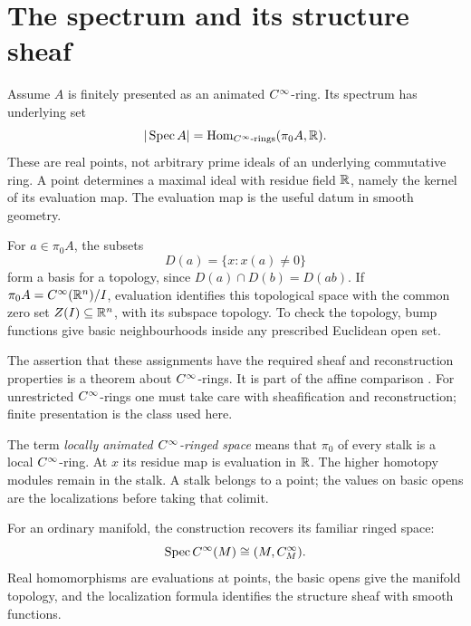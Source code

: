 \section{The spectrum and its structure sheaf}

Assume $A$ is finitely presented as an animated $C^\infty$-ring.
Its spectrum has underlying set
\[
 |\operatorname{Spec} A|=\operatorname{Hom}_{C^\infty\text{-rings}}(\pi_0A,\mathbb{R}).
\]
These are real points, not arbitrary prime ideals of an underlying
commutative ring. A point determines a maximal ideal with residue field
$\mathbb{R}$, namely the kernel of its evaluation map. The evaluation map
is the useful datum in smooth geometry.

For $a\in\pi_0A$, the subsets
\[
 D(a)=\{x:x(a)\neq0\}
\]
form a basis for a topology, since $D(a)\cap D(b)=D(ab)$.
If $\pi_0A=C^\infty(\mathbb{R}^n)/I$, evaluation identifies this topological
space with the common zero set $Z(I)\subseteq\mathbb{R}^n$, with its subspace
topology. To check the topology, bump functions give basic
neighbourhoods inside any prescribed Euclidean open set.


The assertion that these assignments have the required sheaf and
reconstruction properties is a theorem about $C^\infty$-rings.
It is part of the affine comparison
\cite[Section~4.1.3, especially Corollary~4.1.3.34 and Remark~4.1.3.35]
{Steffens_Derived_Differential_Geometry}.
For unrestricted $C^\infty$-rings one must take care with sheafification
and reconstruction; finite presentation is the class used here.

The term \emph{locally animated $C^\infty$-ringed space} means that
$\pi_0$ of every stalk is a local $C^\infty$-ring. At $x$ its residue map
is evaluation in $\mathbb{R}$. The higher homotopy modules remain in the stalk.
A stalk belongs to a point; the values on basic opens are the
localizations before taking that colimit.

For an ordinary manifold, the construction recovers its familiar
ringed space:
\[
 \operatorname{Spec}C^\infty(M)\cong(M,C^\infty_M).
\]
Real homomorphisms are evaluations at points, the basic opens give
the manifold topology, and the localization formula identifies the
structure sheaf with smooth functions.

